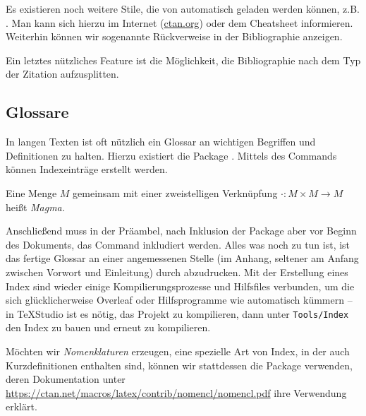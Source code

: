 Es existieren noch weitere Stile, die von  automatisch geladen werden können, z.B. .
Man kann sich hierzu im Internet (\url{ctan.org}) oder dem Cheatsheet informieren.
Weiterhin können wir sogenannte Rückverweise in der Bibliographie anzeigen.
\begin{latexlisting}
	\usepackage[backref=true]{biblatex}
\end{latexlisting}
Ein letztes nützliches Feature ist die Möglichkeit, die Bibliographie nach dem Typ der Zitation aufzusplitten.
\begin{latexlisting}
	\printbibliography[title={Bücher}, type=book]
	\printbibliography[title={Andere Quellen}, nottype=book]
\end{latexlisting}

\subsection{Glossare}
In langen Texten ist oft nützlich ein Glossar an wichtigen Begriffen und Definitionen zu halten.
Hierzu existiert die Package .
Mittels des Commands  können Indexeinträge erstellt werden.
\begin{latexlisting}
	\begin{definition}[Magma]\label{def:magma}
		Eine Menge $M$ gemeinsam mit einer zweistelligen Verknüpfung $\cdot: M \times M \to M$ heißt \emph{Magma.}
	\end{definition}
\end{latexlisting}
Anschließend muss in der Präambel, nach Inklusion der Package aber vor Beginn des Dokuments, das Command  inkludiert werden.
Alles was noch zu tun ist, ist das fertige Glossar an einer angemessenen Stelle (im Anhang, seltener am Anfang zwischen Vorwort und Einleitung) durch  abzudrucken.
Mit der Erstellung eines Index sind wieder einige Kompilierungsprozesse und Hilfsfiles verbunden, um die sich glücklicherweise Overleaf oder Hilfsprogramme wie  automatisch kümmern -- in TeXStudio ist es nötig, das Projekt zu kompilieren, dann unter \texttt{Tools/Index} den Index zu bauen und erneut zu kompilieren.

Möchten wir \emph{Nomenklaturen} erzeugen, eine spezielle Art von Index, in der auch Kurzdefinitionen enthalten sind, können wir stattdessen die Package  verwenden, deren Dokumentation unter \url{https://ctan.net/macros/latex/contrib/nomencl/nomencl.pdf} ihre Verwendung erklärt.

